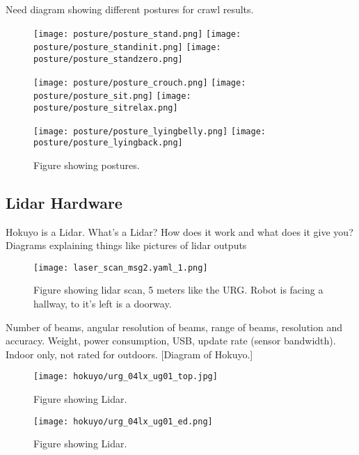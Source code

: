 Need diagram showing different postures for crawl results. 
\begin{figure}
  \centerline{
    \texttt{[image: posture/posture\_stand.png]}
    \texttt{[image: posture/posture\_standinit.png]}
    \texttt{[image: posture/posture\_standzero.png]}
  }
  \vspace*{0.05in}
  \centerline{
    \texttt{[image: posture/posture\_crouch.png]}
    \texttt{[image: posture/posture\_sit.png]}
    \texttt{[image: posture/posture\_sitrelax.png]}
  }
  \vspace*{0.05in}
  \centerline{
    \texttt{[image: posture/posture\_lyingbelly.png]}
    \texttt{[image: posture/posture\_lyingback.png]}
    }
  \caption{Figure showing postures.}
  \label{fig:nao_postures1}
\end{figure}

\subsection{Lidar Hardware}
Hokuyo is a Lidar. What's a Lidar? How does it work and what does it give you? 
{Diagrams explaining things like pictures of lidar outputs}

\begin{figure}
    \centering
    \texttt{[image: laser\_scan\_msg2.yaml\_1.png]}
    \caption{Figure showing lidar scan, 5 meters like the URG.
             Robot is facing a hallway, to it's left is a doorway.}
    \label{fig:lidar_scan1}
\end{figure}

Number of beams, angular resolution of beams, range of beams, resolution and accuracy.
Weight, power consumption, USB, update rate (sensor bandwidth).
Indoor only, not rated for outdoors.
[Diagram of Hokuyo.]

\begin{figure}
  \centering
  \texttt{[image: hokuyo/urg\_04lx\_ug01\_top.jpg]}
  \caption{Figure showing Lidar.}
  \label{fig:lidar_top1}
\end{figure}

\begin{figure}
  \centering
  \texttt{[image: hokuyo/urg\_04lx\_ug01\_ed.png]}
  \caption{Figure showing Lidar.}
  \label{fig:lidar_diagram1}
\end{figure}

